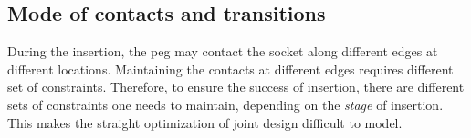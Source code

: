 \documentclass[11pt, twocolumn]{article}
\begin{document}



\subsection{Mode of contacts and transitions}





During the insertion, the peg may contact the socket along different edges at different locations. Maintaining the contacts at different edges requires different set of constraints. Therefore, to ensure the success of insertion, there are different sets of constraints one needs to maintain, depending on the {\em stage} of insertion. This makes the straight optimization of joint design difficult to model. 
\end{document}
